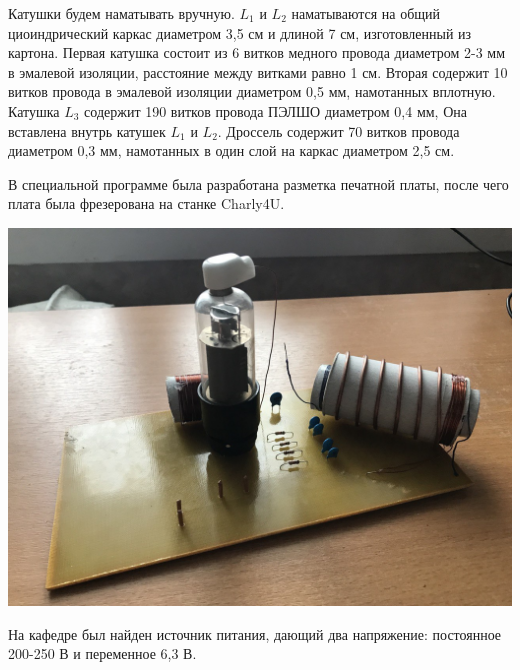 \documentclass[a4paper,12pt]{article} %
\begin{document}
\noindent Катушки будем наматывать вручную. $L_1$ и $L_2$ наматываются на общий циоиндрический каркас диаметром 3,5 см и длиной 7 см, изготовленный из картона. Первая катушка состоит из 6 витков медного провода диаметром 2-3 мм в эмалевой изоляции, расстояние между витками равно 1 см. Вторая содержит 10 витков провода в эмалевой изоляции диаметром 0,5 мм, намотанных вплотную. Катушка $L_3$ содержит 190 витков провода ПЭЛШО диаметром 0,4 мм, Она вставлена внутрь катушек $L_1$ и $L_2$. Дроссель содержит 70 витков провода диаметром 0,3 мм, намотанных в один слой на каркас диаметром 2,5 см.

\medskip

\noindent В специальной программе была разработана разметка печатной платы, после чего плата была фрезерована на станке Charly4U.

\medskip
\begin{center}

  \centering
  \includegraphics[scale={0.2}]{плата.jpg}

\end{center}

\medskip

\noindent На кафедре был найден источник питания, дающий два напряжение: постоянное 200-250 В и переменное 6,3 В.
\end{document}
